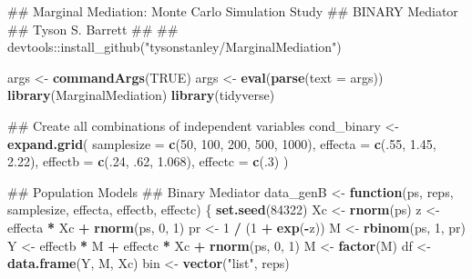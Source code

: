 \documentclass[]{DissertateCUNY}
\newenvironment{Shaded}{\begin{snugshade}}{\end{snugshade}}
\newcommand{\KeywordTok}[1]{\textcolor[rgb]{0.13,0.29,0.53}{\textbf{#1}}}
\newcommand{\DataTypeTok}[1]{\textcolor[rgb]{0.13,0.29,0.53}{#1}}
\newcommand{\DecValTok}[1]{\textcolor[rgb]{0.00,0.00,0.81}{#1}}
\newcommand{\FloatTok}[1]{\textcolor[rgb]{0.00,0.00,0.81}{#1}}
\newcommand{\StringTok}[1]{\textcolor[rgb]{0.31,0.60,0.02}{#1}}
\newcommand{\OtherTok}[1]{\textcolor[rgb]{0.56,0.35,0.01}{#1}}
\newcommand{\ControlFlowTok}[1]{\textcolor[rgb]{0.13,0.29,0.53}{\textbf{#1}}}
\newcommand{\OperatorTok}[1]{\textcolor[rgb]{0.81,0.36,0.00}{\textbf{#1}}}
\newcommand{\NormalTok}[1]{#1}
\begin{document}
\begin{Shaded}
\begin{Highlighting}[]
\NormalTok{## Marginal Mediation: Monte Carlo Simulation Study}
\NormalTok{##   BINARY Mediator}
\NormalTok{## Tyson S. Barrett}
\NormalTok{##}
\NormalTok{## devtools::install_github("tysonstanley/MarginalMediation")}

\NormalTok{args <-}\StringTok{ }\KeywordTok{commandArgs}\NormalTok{(}\OtherTok{TRUE}\NormalTok{)}
\NormalTok{args <-}\StringTok{ }\KeywordTok{eval}\NormalTok{(}\KeywordTok{parse}\NormalTok{(}\DataTypeTok{text =}\NormalTok{ args))}
\KeywordTok{library}\NormalTok{(MarginalMediation)}
\KeywordTok{library}\NormalTok{(tidyverse)}

\NormalTok{## Create all combinations of independent variables}
\NormalTok{cond_binary <-}\StringTok{ }\KeywordTok{expand.grid}\NormalTok{(}
  \DataTypeTok{samplesize =} \KeywordTok{c}\NormalTok{(}\DecValTok{50}\NormalTok{, }\DecValTok{100}\NormalTok{, }\DecValTok{200}\NormalTok{, }\DecValTok{500}\NormalTok{, }\DecValTok{1000}\NormalTok{),}
  \DataTypeTok{effecta =} \KeywordTok{c}\NormalTok{(.}\DecValTok{55}\NormalTok{, }\FloatTok{1.45}\NormalTok{, }\FloatTok{2.22}\NormalTok{),}
  \DataTypeTok{effectb =} \KeywordTok{c}\NormalTok{(.}\DecValTok{24}\NormalTok{, .}\DecValTok{62}\NormalTok{, }\FloatTok{1.068}\NormalTok{),}
  \DataTypeTok{effectc =} \KeywordTok{c}\NormalTok{(.}\DecValTok{3}\NormalTok{)}
\NormalTok{)}

\NormalTok{## Population Models}
\NormalTok{## Binary Mediator}
\NormalTok{data_genB <-}\StringTok{ }\ControlFlowTok{function}\NormalTok{(ps, reps, samplesize, effecta, effectb, effectc) \{}
  \KeywordTok{set.seed}\NormalTok{(}\DecValTok{84322}\NormalTok{)}
\NormalTok{  Xc <-}\StringTok{ }\KeywordTok{rnorm}\NormalTok{(ps)}
\NormalTok{  z <-}\StringTok{ }\NormalTok{effecta }\OperatorTok{*}\StringTok{ }\NormalTok{Xc }\OperatorTok{+}\StringTok{ }\KeywordTok{rnorm}\NormalTok{(ps, }\DecValTok{0}\NormalTok{, }\DecValTok{1}\NormalTok{)}
\NormalTok{  pr <-}\StringTok{ }\DecValTok{1} \OperatorTok{/}\StringTok{ }\NormalTok{(}\DecValTok{1} \OperatorTok{+}\StringTok{ }\KeywordTok{exp}\NormalTok{(}\OperatorTok{-}\NormalTok{z))}
\NormalTok{  M <-}\StringTok{ }\KeywordTok{rbinom}\NormalTok{(ps, }\DecValTok{1}\NormalTok{, pr)}
\NormalTok{  Y <-}\StringTok{ }\NormalTok{effectb }\OperatorTok{*}\StringTok{ }\NormalTok{M }\OperatorTok{+}\StringTok{ }\NormalTok{effectc }\OperatorTok{*}\StringTok{ }\NormalTok{Xc }\OperatorTok{+}\StringTok{ }\KeywordTok{rnorm}\NormalTok{(ps, }\DecValTok{0}\NormalTok{, }\DecValTok{1}\NormalTok{)}
\NormalTok{  M <-}\StringTok{ }\KeywordTok{factor}\NormalTok{(M)}
\NormalTok{  df <-}\StringTok{ }\KeywordTok{data.frame}\NormalTok{(Y, M, Xc)}
\NormalTok{  bin <-}\StringTok{ }\KeywordTok{vector}\NormalTok{(}\StringTok{"list"}\NormalTok{, reps)}


\end{Highlighting}
\end{Shaded}
\end{document}
